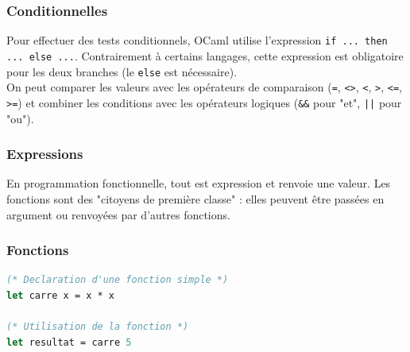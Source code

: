 \documentclass{article}
\begin{document}
\subsubsection{Conditionnelles}

Pour effectuer des tests conditionnels, OCaml utilise l'expression \texttt{if ... then ... else ...}. Contrairement à certains langages, cette expression est obligatoire pour les deux branches (le \texttt{else} est nécessaire).\\
On peut comparer les valeurs avec les opérateurs de comparaison (\texttt{=}, \texttt{<>}, \texttt{<}, \texttt{>}, \texttt{<=}, \texttt{>=}) et combiner les conditions avec les opérateurs logiques (\texttt{\&\&} pour "et", \texttt{||} pour "ou").


\subsubsection{Expressions}
En programmation fonctionnelle, tout est expression et renvoie une valeur. Les fonctions sont des "citoyens de première classe" : elles peuvent être passées en argument ou renvoyées par d'autres fonctions.

\subsubsection{Fonctions}



\begin{lstlisting}[language=Caml]
(* Declaration d'une fonction simple *)
let carre x = x * x

(* Utilisation de la fonction *)
let resultat = carre 5
\end{lstlisting}
\end{document}
